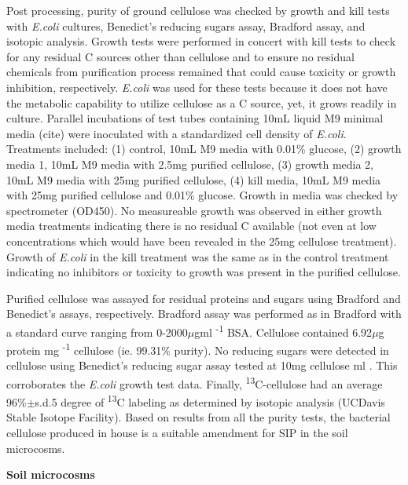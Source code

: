 Post processing, purity of ground cellulose was checked by growth and kill tests with \textit{E.coli} cultures, Benedict's reducing sugars assay, Bradford assay, and isotopic analysis. Growth tests were performed in concert with kill tests to check for any residual C sources other than cellulose and to ensure no residual chemicals from purification process remained that could cause toxicity or growth inhibition, respectively. \textit{E.coli} was used for these tests because it does not have the metabolic capability to utilize cellulose as a C source, yet, it grows readily in culture. Parallel incubations of test tubes containing 10mL liquid M9 minimal media (cite) were inoculated with a standardized cell density of \textit{E.coli}. Treatments included: (1) control, 10mL M9 media with 0.01\% glucose, (2) growth media 1, 10mL M9 media with 2.5mg purified cellulose, (3) growth media 2, 10mL M9 media with 25mg purified cellulose, (4) kill media, 10mL M9 media with 25mg purified cellulose and 0.01\% glucose. Growth in media was checked by spectrometer (OD450). No measureable growth was observed in either growth media treatments indicating there is no residual C available (not even at low concentrations which would have been revealed in the 25mg cellulose treatment). Growth of \textit{E.coli} in the kill treatment was the same as in the control treatment indicating no inhibitors or toxicity to growth was present in the purified cellulose.           

Purified cellulose was assayed for residual proteins and sugars using Bradford and Benedict's assays, respectively. Bradford assay was performed as in Bradford \cite{Bradford_1976} with a standard curve ranging from 0-2000$\mu$gml \textsuperscript{-1} BSA. Cellulose contained 6.92$\mu$g protein mg \textsuperscript{-1} cellulose (ie. 99.31\% purity). No reducing sugars were detected in cellulose using Benedict's reducing sugar assay \cite{benedict1909reagent} tested at 10mg cellulose ml . This corroborates the \textit{E.coli} growth test data. Finally, \textsuperscript{13}C-cellulose had an average 96\%$\pm$s.d.5 degree of \textsuperscript{13}C labeling as determined by isotopic analysis (UCDavis Stable Isotope Facility). Based on results from all the purity tests, the bacterial cellulose produced in house is a suitable amendment for SIP in the soil microcosms.           

\textbf{Soil microcosms}

